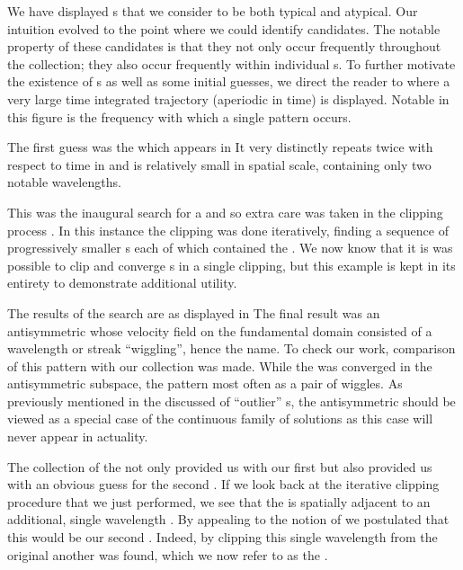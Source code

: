 We have displayed {\po}s that we consider to be both typical and atypical.
Our intuition evolved to the point where we could identify {\fpo} candidates.
The notable property of these candidates is that they not only occur frequently throughout the
{\po} collection; they also occur frequently within individual {\po}s.
To further motivate the existence of
{\fpo}s as well as some initial guesses, we direct the reader to %
where a very large time integrated trajectory (aperiodic in time)
is displayed. Notable in this figure is the {\spt}
frequency with which a single pattern occurs.

The first guess was the {\wiggle} which appears in%
It very distinctly repeats twice with respect to time in
and is relatively small in spatial scale, containing only two notable wavelengths.

This was the inaugural search for a {\fpo} and so extra
care was taken in the clipping process .
In this instance the clipping was done iteratively, finding
a sequence of progressively smaller {\po}s each of which contained the {\fpo}.
We now know that it is was possible to clip and converge {\fpo}s in a single clipping,
but this example is kept in its entirety to demonstrate additional utility.

The results of the {\wiggle} search are as displayed in %
The final result was an antisymmetric {\fpo} whose velocity field on
the fundamental domain consisted of a wavelength or streak ``wiggling'', hence the name.
To check our work, comparison of this pattern with our {\po} collection was made.
While the {\wiggle} was converged in the antisymmetric subspace, the
pattern most often as a pair of wiggles.
As previously mentioned in the discussed of ``outlier'' {\po}s, the antisymmetric {\wiggle}
should be viewed as a special case of the continuous family of {\wiggle} solutions as
this case will never appear in actuality.

The collection of the {\wiggle} not only provided us with our first {\fpo} but also
provided us with an obvious guess for the second {\fpo}. If we look back
at the iterative clipping procedure that we just performed, %
we see that the {\wiggle} is spatially adjacent to an additional,
single wavelength {\eqv}. %
By appealing to the notion of {\spt} {\symbolic} we postulated that
this {\eqv} would be our second {\fpo}. Indeed, by clipping this
single wavelength {\eqv} from the original {\po} another {\fpo} was found,
which we now refer to as the {\streak}.

